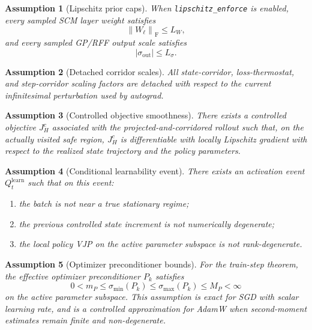 \documentclass[11pt]{article}
\newtheorem{assumption}{Assumption}
\newcommand{\1}{\mathbf{1}}
\newcommand{\abs}[1]{\left\lvert #1 \right\rvert}
\newcommand{\frobnorm}[1]{\left\lVert #1 \right\rVert_{\mathrm{F}}}
\begin{document}
\begin{assumption}[Lipschitz prior caps]
When \texttt{lipschitz\_enforce} is enabled, every sampled SCM layer weight satisfies
\begin{equation}
  \frobnorm{W_\ell} \le L_W,
\end{equation}
and every sampled GP/RFF output scale satisfies
\begin{equation}
  \abs{\sigma_{\mathrm{out}}} \le L_{\sigma}.
\end{equation}
\end{assumption}

\begin{assumption}[Detached corridor scales]
All state-corridor, loss-thermostat, and step-corridor scaling factors are detached with respect to the current infinitesimal perturbation used by autograd.
\end{assumption}

\begin{assumption}[Controlled objective smoothness]
There exists a controlled objective $J_H^c$ associated with the projected-and-corridored rollout such that, on the actually visited safe region, $J_H^c$ is differentiable with locally Lipschitz gradient with respect to the realized state trajectory and the policy parameters.
\end{assumption}

\begin{assumption}[Conditional learnability event]
There exists an activation event $Q_t^{\mathrm{learn}}$ such that on this event:
\begin{enumerate}[label=(\alph*)]
  \item the batch is not near a true stationary regime;
  \item the previous controlled state increment is not numerically degenerate;
  \item the local policy VJP on the active parameter subspace is not rank-degenerate.
\end{enumerate}
\end{assumption}

\begin{assumption}[Optimizer preconditioner bounds]
For the train-step theorem, the effective optimizer preconditioner $P_k$ satisfies
\begin{equation}
  0 < m_P \le \sigma_{\min}(P_k) \le \sigma_{\max}(P_k) \le M_P < \infty
\end{equation}
on the active parameter subspace. This assumption is exact for SGD with scalar learning rate, and is a controlled approximation for AdamW when second-moment estimates remain finite and non-degenerate.
\end{assumption}
\end{document}
